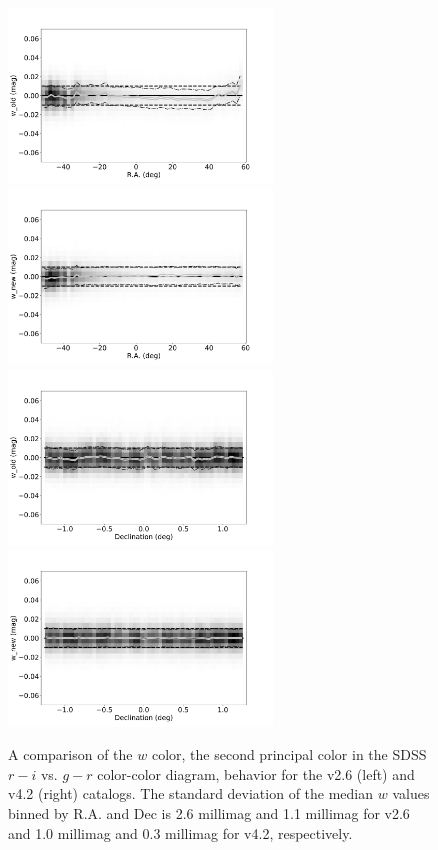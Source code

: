 \documentclass[fleqn,usenatbib]{mnras}
\begin{document}
\begin{figure}[th!]
    \centering\includegraphics[width=7cm]{figures/testV26vsV42_r_w_old_RA_Hess.png}
    \centering\includegraphics[width=7cm]{figures/testV26vsV42_r_w_new_RA_Hess.png}
    \centering\includegraphics[width=7cm]{figures/testV26vsV42_r_w_old_Dec_Hess.png}
    \centering\includegraphics[width=7cm]{figures/testV26vsV42_r_w_new_Dec_Hess.png}
\caption{A comparison of the $w$ color, the second principal color in the SDSS
$r-i$ vs. $g-r$ color-color diagram, behavior for the v2.6 (left) and v4.2 (right)
catalogs. The standard deviation of the median $w$ values binned by R.A. and Dec
is 2.6 millimag and 1.1 millimag for v2.6 and 1.0 millimag and 0.3 millimag for v4.2,
respectively.}
\label{fig:comparew} 
\end{figure}
 
\end{document}
